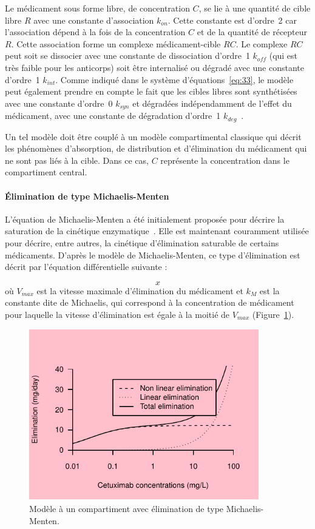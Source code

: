 Le médicament sous forme libre, de concentration $C$, se lie à une quantité de cible libre $R$ avec une constante d'association $k_{on}$. Cette constante est d'ordre~2 car l'association dépend à la fois de la concentration $C$ et de la quantité de récepteur $R$. Cette association forme un complexe médicament-cible $RC$. Le complexe $RC$ peut soit se dissocier avec une constante de dissociation d'ordre~1 $k_{off}$ (qui est très faible pour les anticorps) soit être internalisé ou dégradé avec une constante d'ordre~1 $k_{int}$. Comme indiqué dans le système d'équations~\ref{eq:33}, le modèle peut également prendre en compte le fait que les cibles libres sont synthétisées avec une constante d'ordre~0 $k_{syn}$ et dégradées indépendamment de l'effet du médicament, avec une constante de dégradation d'ordre~1 $k_{deg}$~\citep{REF3}.

Un tel modèle doit être couplé à un modèle compartimental classique qui décrit les phénomènes d'absorption, de distribution et d'élimination du médicament qui ne sont pas liés à la cible. Dans ce cas, $C$ représente la concentration dans le compartiment central.

\paragraph{Élimination de type Michaelis-Menten} L'équation de Michaelis-Menten a été initialement proposée pour décrire la saturation de la cinétique enzymatique~\citep{REF5}. Elle est maintenant couramment utilisée pour décrire, entre autres, la cinétique d'élimination saturable de certains médicaments. D'après le modèle de Michaelis-Menten, ce type d'élimination est décrit par l'équation différentielle suivante :

\begin{equation}
x
\label{eq:34}
\end{equation}
où $V_{max}$ est la vitesse maximale d'élimination du médicament et $k_M$ est la constante dite de Michaelis, qui correspond à la concentration de médicament pour laquelle la vitesse d'élimination est égale à la moitié de $V_{max}$ (Figure~\ref{fig:7}).

\begin{figure}[htbp]
	\centering
		\includegraphics[width=10cm]{images/essai001.pdf}
	\caption{Modèle à un compartiment avec élimination de type Michaelis-Menten.}
	\label{fig:7}
\end{figure}

